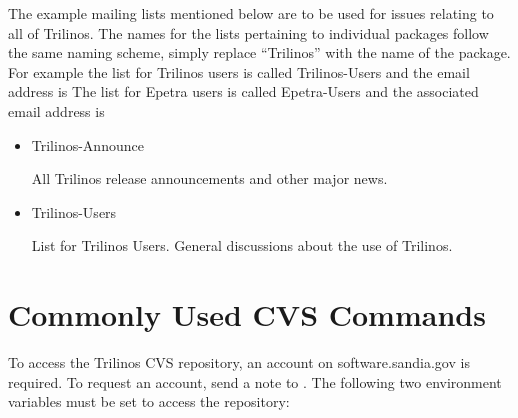 \documentclass[12pt,relax]{TrilinosUserGuide}
\begin{document}
\begin{minipage}[c]{\textwidth}
\begin{minipage}[l]{.6\textwidth}
The example mailing lists mentioned below are to be used 
for issues relating to all of Trilinos.  The names for the lists pertaining to 
individual packages follow the same naming scheme, simply replace ``Trilinos'' 
with the name of the package.  For example the list for Trilinos users is 
called Trilinos-Users and the email address is 
  The list 
for Epetra users is called Epetra-Users and the associated email address is 
\end{minipage}\hfill
{}
\end{minipage}


\begin{itemize}
\item Trilinos-Announce 

All Trilinos release announcements and other major news.

\item Trilinos-Users 

List for Trilinos Users.  General discussions about the use of Trilinos.
\end{itemize}


\clearpage

%


\appendix
\section{Commonly Used CVS Commands}
\label{Section:CVS}
To access the Trilinos CVS repository, an account on software.sandia.gov is 
required.  To request an account, send a note to 
.  
The following two 
environment variables must be set to access the repository:
\end{document}
